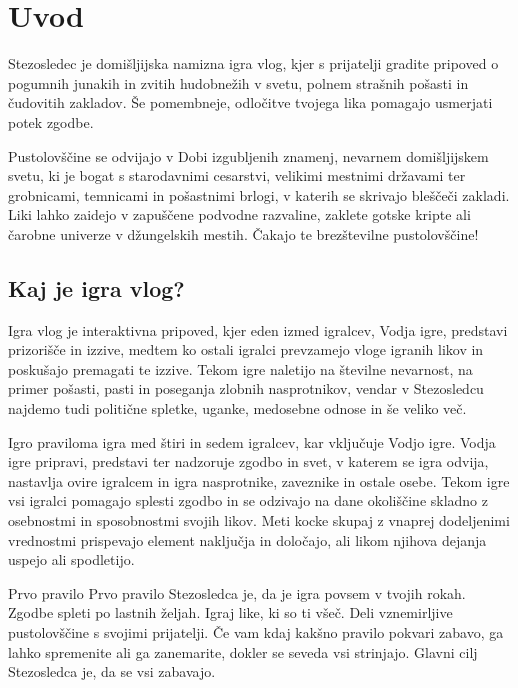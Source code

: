 \chapter{Uvod}

Stezosledec je domišljijska namizna igra vlog, kjer s prijatelji gradite pripoved o pogumnih junakih in zvitih hudobnežih v svetu, polnem strašnih pošasti in čudovitih zakladov. Še pomembneje, odločitve tvojega lika pomagajo usmerjati potek zgodbe.

Pustolovščine se odvijajo v Dobi izgubljenih znamenj, nevarnem domišljijskem svetu, ki je bogat s starodavnimi cesarstvi, velikimi mestnimi državami ter grobnicami, temnicami in pošastnimi brlogi, v katerih se skrivajo bleščeči zakladi. Liki lahko zaidejo v zapuščene podvodne razvaline, zaklete gotske kripte ali čarobne univerze v džungelskih mestih. Čakajo te brezštevilne pustolovščine!

\section{Kaj je igra vlog?}

Igra vlog je interaktivna pripoved, kjer eden izmed igralcev, Vodja igre, predstavi prizorišče in izzive, medtem ko ostali igralci prevzamejo vloge igranih likov in poskušajo premagati te izzive. Tekom igre naletijo na številne nevarnost, na primer pošasti, pasti in poseganja zlobnih nasprotnikov, vendar v Stezosledcu najdemo tudi politične spletke, uganke, medosebne odnose in še veliko več.

Igro praviloma igra med štiri in sedem igralcev, kar vključuje Vodjo igre. Vodja igre pripravi, predstavi ter nadzoruje zgodbo in svet, v katerem se igra odvija, nastavlja ovire igralcem in igra nasprotnike, zaveznike in ostale osebe. Tekom igre vsi igralci pomagajo splesti zgodbo in se odzivajo na dane okoliščine skladno z osebnostmi in sposobnostmi svojih likov. Meti kocke skupaj z vnaprej dodeljenimi vrednostmi prispevajo element naključja in določajo, ali likom njihova dejanja uspejo ali spodletijo.

\begin{rpg-titlebox}{Prvo pravilo}
    Prvo pravilo Stezosledca je, da je igra povsem v tvojih rokah. Zgodbe spleti po lastnih željah. Igraj like, ki so ti všeč. Deli vznemirljive pustolovščine s svojimi prijatelji. Če vam kdaj kakšno pravilo pokvari zabavo, ga lahko spremenite ali ga zanemarite, dokler se seveda vsi strinjajo. Glavni cilj Stezosledca je, da se vsi zabavajo.
\end{rpg-titlebox}

